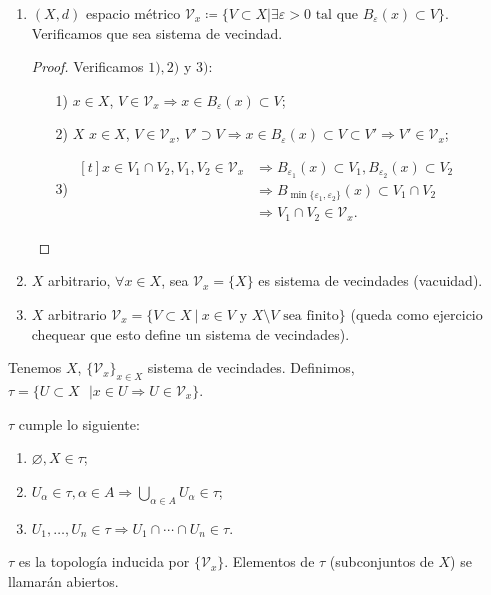 \begin{eg}
	\begin{enumerate}
		\item $(X,d)$ espacio métrico $\mathcal{V}_x \coloneq \{ V \subset X | \exists \varepsilon > 0 \text{ tal que } B_{\varepsilon} (x) \subset V \}$. Verificamos que sea sistema de vecindad.

		\begin{proof}[Proof]
			Verificamos $1),2)$ y $3)$:
			\begin{enumerate}
				\item[1)] $x \in X$, $V \in \mathcal{V}_x \Rightarrow x \in B_{\varepsilon} (x) \subset V$;

				\item[2)] $X$ $x \in X$, $V \in \mathcal{V}_x$, $V' \supset V \Rightarrow x \in B_{\varepsilon} (x) \subset V \subset V' \Rightarrow V' \in \mathcal{V}_x$;

				\item[3)] $\begin{aligned}[t]
					x \in V_1 \cap V_2, V_1,V_2 \in \mathcal{V}_x & \Rightarrow B_{\varepsilon_1} (x) \subset V_1, B_{\varepsilon_2} (x) \subset V_2  \\ & \Rightarrow B_{\min \{ \varepsilon_1, \varepsilon_2 \}} (x) \subset V_1 \cap V_2 \\ & \Rightarrow V_1 \cap V_2 \in \mathcal{V}_x.
				\end{aligned}$
			\end{enumerate}
		\end{proof}

		\item $X$ arbitrario, $\forall x \in X$, sea $\mathcal{V}_x = \{ X \}$ es sistema de vecindades (vacuidad).

		\item $X$ arbitrario $\mathcal{V}_x = \{ V \subset X \ | \ x \in V \text{ y } X \setminus V \text{ sea finito} \}$ (queda como ejercicio chequear que esto define un sistema de vecindades).  
	\end{enumerate}
\end{eg}

\begin{definition}
	Tenemos $X$, $\{ \mathcal{V}_x \}_{x \in X}$ sistema de vecindades. Definimos, $\tau = \{ U \subset X \text{ } | x \in U \Rightarrow U \in \mathcal{V}_x \}$.    
\end{definition}

\begin{lemma}
	$\tau$ cumple lo siguiente:

	\begin{enumerate}
		\item $\varnothing, X \in \tau$;

		\item $U_{\alpha} \in \tau, \alpha \in A \Rightarrow \bigcup_{\alpha \in A} U_{\alpha} \in \tau$;

		\item $U_1,\dots,U_n \in \tau \Rightarrow U_1 \cap \cdots \cap U_n \in \tau$.
	\end{enumerate}
\end{lemma}

$\tau$ es la topología inducida por $\{ \mathcal{V}_x \}$. Elementos de $\tau$ (subconjuntos de $X$) se llamarán abiertos.
